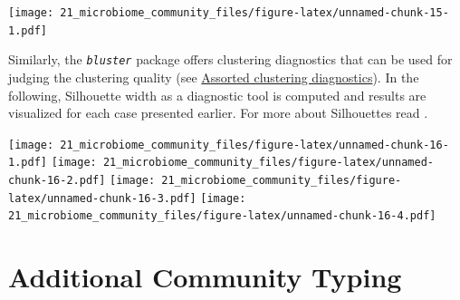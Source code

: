 \documentclass[
]{book}
\newenvironment{Shaded}{\begin{snugshade}}{\end{snugshade}}
\newcommand{\AttributeTok}[1]{\textcolor[rgb]{0.77,0.63,0.00}{#1}}
\newcommand{\CommentTok}[1]{\textcolor[rgb]{0.56,0.35,0.01}{\textit{#1}}}
\newcommand{\ControlFlowTok}[1]{\textcolor[rgb]{0.13,0.29,0.53}{\textbf{#1}}}
\newcommand{\FunctionTok}[1]{\textcolor[rgb]{0.00,0.00,0.00}{#1}}
\newcommand{\NormalTok}[1]{#1}
\newcommand{\OtherTok}[1]{\textcolor[rgb]{0.56,0.35,0.01}{#1}}
\newcommand{\SpecialCharTok}[1]{\textcolor[rgb]{0.00,0.00,0.00}{#1}}
\newcommand{\StringTok}[1]{\textcolor[rgb]{0.31,0.60,0.02}{#1}}
\begin{document}
\texttt{[image: 21\_microbiome\_community\_files/figure-latex/unnamed-chunk-15-1.pdf]}

Similarly, the \emph{\texttt{bluster}} \citep{R-bluster} package offers clustering
diagnostics that can be used for judging the clustering quality (see
\href{http://bioconductor.org/packages/release/bioc/vignettes/bluster/inst/doc/diagnostics.html}{Assorted clustering
diagnostics}).
In the following, Silhouette width as a diagnostic tool is computed
and results are visualized for each case presented earlier. For more
about Silhouettes read \citep{Rousseeuw1987}.

\begin{Shaded}
\end{Shaded}

\texttt{[image: 21\_microbiome\_community\_files/figure-latex/unnamed-chunk-16-1.pdf]} \texttt{[image: 21\_microbiome\_community\_files/figure-latex/unnamed-chunk-16-2.pdf]} \texttt{[image: 21\_microbiome\_community\_files/figure-latex/unnamed-chunk-16-3.pdf]} \texttt{[image: 21\_microbiome\_community\_files/figure-latex/unnamed-chunk-16-4.pdf]}

\hypertarget{additional-community-typing}{%
\section{Additional Community Typing}\label{additional-community-typing}}
\end{document}
